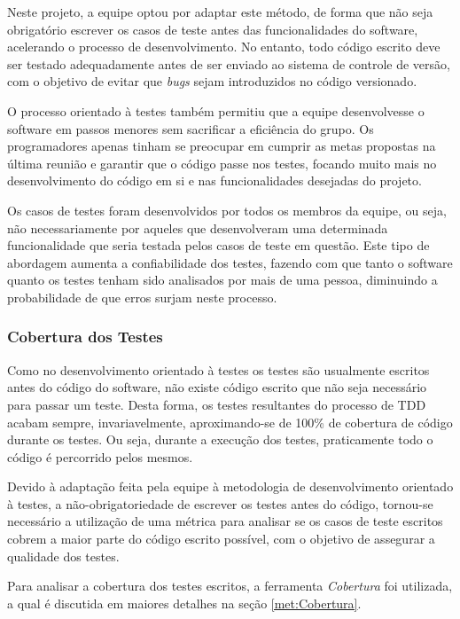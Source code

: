 Neste projeto, a equipe optou por adaptar este método, de forma que não seja obrigatório escrever os casos de teste antes das funcionalidades do software, acelerando o processo de desenvolvimento.
No entanto, todo código escrito deve ser testado adequadamente antes de ser enviado ao sistema de controle de versão, com o objetivo de evitar que \emph{bugs} sejam introduzidos no código versionado.

O processo orientado à testes também permitiu que a equipe desenvolvesse o software em passos menores sem sacrificar a eficiência do grupo.
Os programadores apenas tinham se preocupar em cumprir as metas propostas na última reunião e garantir que o código passe nos testes, focando muito mais no desenvolvimento do código em si e nas funcionalidades desejadas do projeto.

Os casos de testes foram desenvolvidos por todos os membros da equipe, ou seja, não necessariamente por aqueles que desenvolveram uma determinada funcionalidade que seria testada pelos casos de teste em questão.
Este tipo de abordagem aumenta a confiabilidade dos testes, fazendo com que tanto o software quanto os testes tenham sido analisados por mais de uma pessoa, diminuindo a probabilidade de que erros surjam neste processo.


\subsubsection{Cobertura dos Testes}

Como no desenvolvimento orientado à testes os testes são usualmente escritos antes do código do software, não existe código escrito que não seja necessário para passar um teste.
Desta forma, os testes resultantes do processo de TDD acabam sempre, invariavelmente, aproximando-se de 100\% de cobertura de código durante os testes.
Ou seja, durante a execução dos testes, praticamente todo o código é percorrido pelos mesmos.

Devido à adaptação feita pela equipe à metodologia de desenvolvimento orientado à testes, a não-obrigatoriedade de escrever os testes antes do código, tornou-se necessário a utilização de uma métrica para analisar se os casos de teste escritos cobrem a maior parte do código escrito possível, com o objetivo de assegurar a qualidade dos testes.

Para analisar a cobertura dos testes escritos, a ferramenta \emph{Cobertura} foi utilizada, a qual é discutida em maiores detalhes na seção \ref{met:Cobertura}.


